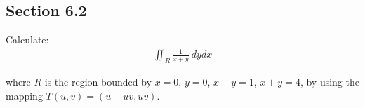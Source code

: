 \subsection{Section 6.2}

\begin{tcolorbox}[
        title={Problem 10},
        valign=center,
        nobeforeafter,
        colframe=gray!95!black
    ]
    
    Calculate:
    \begin{align}
        \iint_R \frac{1}{x + y} \ dydx
    \end{align}
    
    where \(R\) is the region bounded by \(x = 0\), \(y = 0\), \(x + y = 1\), \(x + y = 4\), by using the mapping \(T(u, v) = (u - uv, uv)\).
\end{tcolorbox}

